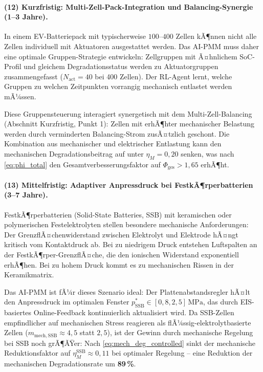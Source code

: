 ﻿\documentclass[12pt,a4paper]{article}
\begin{document}
\paragraph{(12) Kurzfristig: Multi-Zell-Pack-Integration und
	Balancing-Synergie (1--3 Jahre).}
In einem EV-Batteriepack mit typischerweise $100\text{--}400$ Zellen
kÃ¶nnen nicht alle Zellen individuell mit Aktuatoren ausgestattet werden.
Das AI-PMM muss daher eine optimale Gruppen-Strategie entwickeln:
Zellgruppen mit Ã¤hnlichem SoC-Profil und gleichem Degradationsstatus
werden zu Aktuatorgruppen zusammengefasst ($N_\mathrm{act} = 40$ bei
400 Zellen). Der RL-Agent lernt, welche Gruppen zu welchen Zeitpunkten
vorrangig mechanisch entlastet werden mÃ¼ssen.

Diese Gruppensteuerung interagiert synergetisch mit dem Multi-Zell-Balancing
(Abschnitt Kurzfristig, Punkt 1): Zellen mit erhÃ¶hter mechanischer Belastung
werden durch verminderten Balancing-Strom zusÃ¤tzlich geschont. Die Kombination
aus mechanischer und elektrischer Entlastung kann den mechanischen Degradationsbeitrag
auf unter $\eta_M = 0{,}20$ senken, was nach \eqref{eq:phi_total} den
Gesamtverbesserungsfaktor auf $\Phi_\mathrm{ges} > 1{,}65$ erhÃ¶ht.

\paragraph{(13) Mittelfristig: Adaptiver Anpressdruck bei
	FestkÃ¶rperbatterien (3--7 Jahre).}
FestkÃ¶rperbatterien (Solid-State Batteries, SSB) mit keramischen oder
polymerischen Festelektrolyten stellen besondere mechanische Anforderungen:
Der GrenzflÃ¤chenwiderstand zwischen Elektrolyt und Elektrode hÃ¤ngt
kritisch vom Kontaktdruck ab. Bei zu niedrigem Druck entstehen Luftspalten
an der FestkÃ¶rper-GrenzflÃ¤che, die den ionischen Widerstand exponentiell
erhÃ¶hen. Bei zu hohem Druck kommt es zu mechanischen Rissen in der
Keramikmatrix.

Das AI-PMM ist fÃ¼r dieses Szenario ideal: Der Plattenabstandsregler
hÃ¤lt den Anpressdruck im optimalen Fenster
$p^*_\mathrm{SSB} \in [0{,}8, 2{,}5]\,\mathrm{MPa}$, das durch
EIS-basiertes Online-Feedback kontinuierlich aktualisiert wird.
Da SSB-Zellen empfindlicher auf mechanischen Stress reagieren als
flÃ¼ssig-elektrolytbasierte Zellen ($m_\mathrm{mech,SSB} \approx 4{,}5$
statt $2{,}5$), ist der Gewinn durch mechanische Regelung bei SSB noch
grÃ¶ÃŸer: Nach \eqref{eq:mech_deg_controlled} sinkt der mechanische
Reduktionsfaktor auf $\eta_M^\mathrm{SSB} \approx 0{,}11$ bei optimaler
Regelung -- eine Reduktion der mechanischen Degradationsrate um \textbf{89\,\%}.
\end{document}
